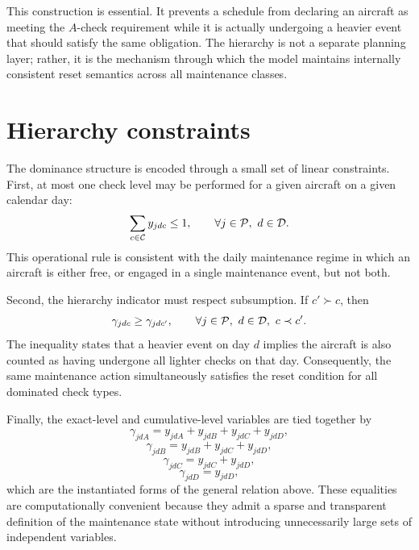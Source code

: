 This construction is essential. It prevents a schedule from declaring an
aircraft as meeting the $A$-check requirement while it is actually undergoing a
heavier event that should satisfy the same obligation. The hierarchy is not a
separate planning layer; rather, it is the mechanism through which the model
maintains internally consistent reset semantics across all maintenance classes.

\section{Hierarchy constraints}
\label{sec:hierarchy_constraints}

The dominance structure is encoded through a small set of linear constraints.
First, at most one check level may be performed for a given aircraft on a given
calendar day:
\begin{equation}
    \sum_{c \in \mathcal{C}} y_{jdc} \leq 1,
    \qquad \forall j \in \mathcal{P},\ d \in \mathcal{D}.
    \label{eq:hier_day_unique}
\end{equation}
This operational rule is consistent with the daily maintenance regime in which an
aircraft is either free, or engaged in a single maintenance event, but not both.

Second, the hierarchy indicator must respect subsumption. If $c' \succ c$, then
\begin{equation}
    \gamma_{jdc} \geq \gamma_{jdc'},
    \qquad \forall j \in \mathcal{P},\ d \in \mathcal{D},\ c \prec c'.
    \label{eq:hier_subsumes}
\end{equation}
The inequality states that a heavier event on day $d$ implies the aircraft is
also counted as having undergone all lighter checks on that day. Consequently,
 the same maintenance action simultaneously satisfies the reset condition for all
 dominated check types.

Finally, the exact-level and cumulative-level variables are tied together by
\begin{equation}
    \gamma_{jdA} = y_{jdA} + y_{jdB} + y_{jdC} + y_{jdD},
\end{equation}
\begin{equation}
    \gamma_{jdB} = y_{jdB} + y_{jdC} + y_{jdD},
\end{equation}
\begin{equation}
    \gamma_{jdC} = y_{jdC} + y_{jdD},
\end{equation}
\begin{equation}
    \gamma_{jdD} = y_{jdD},
\end{equation}
which are the instantiated forms of the general relation above. These equalities
are computationally convenient because they admit a sparse and transparent
definition of the maintenance state without introducing unnecessarily large sets
of independent variables.

